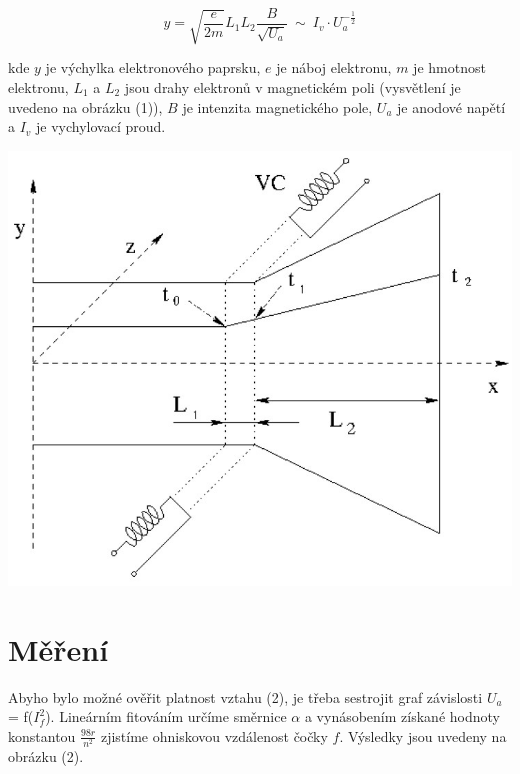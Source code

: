 \documentclass[a4paper,11pt]{article}
\begin{document}
    \hspace{10pt}
    \begin{minipage}[t]{0.5\textwidth} 
                \begin{equation}
                    y = \sqrt{\frac{e}{2m}}L_1L_2\frac{B}{\sqrt{U_a}} ~\sim~ I_v \cdot U_a^{-\frac{1}{2}}
                \end{equation}
                \par kde $y$ je výchylka elektronového paprsku, $e$ je náboj elektronu, $m$ je hmotnost elektronu, $L_1$ a $L_2$ jsou drahy elektronů v magnetickém poli (vysvětlení je uvedeno na obrázku (1)), $B$ je intenzita magnetického pole, $U_a$ je anodové napětí a $I_v$ je vychylovací proud.

                \vspace{10pt}   
                \par \centering
                \includegraphics[scale=0.4]{scheme}
                \captionsetup{justification=centering, font=footnotesize}
                \label{fig:scheme}
                \vspace{10pt}
                \raggedright   

        \section{Měření}      
                \par Abyho bylo možné ověřit platnost vztahu (2), je třeba sestrojit graf závislosti $U_a$ = f($I^2_f$). Lineárním fitováním určíme směrnice $\alpha$ a vynásobením získané hodnoty konstantou $\frac{98r}{n^2}$ zjistíme ohniskovou vzdálenost čočky $f$. Výsledky jsou uvedeny na obrázku (2).
    \end{minipage}
\end{document}
